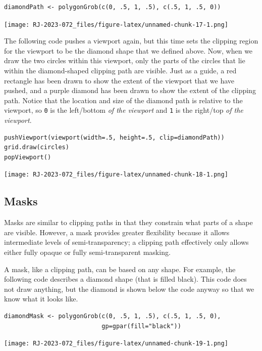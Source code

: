 \begin{verbatim}
diamondPath <- polygonGrob(c(0, .5, 1, .5), c(.5, 1, .5, 0))
\end{verbatim}

\texttt{[image: RJ-2023-072\_files/figure-latex/unnamed-chunk-17-1.png]}

The following code pushes a viewport again,
but this time sets the clipping region for the viewport
to be the diamond shape that we defined above.
Now, when we draw the two circles within this viewport,
only the parts of the circles that lie within the diamond-shaped
clipping path are visible.
Just as a guide, a red rectangle has been drawn to show the extent
of the viewport that we have pushed, and a purple diamond has been
drawn to show the extent of the clipping path. Notice that the
location and size of the diamond path is relative to the viewport,
so \texttt{0} is the left/bottom \emph{of the viewport} and \texttt{1} is the right/top \emph{of
the viewport}.

\begin{verbatim}
pushViewport(viewport(width=.5, height=.5, clip=diamondPath))
grid.draw(circles)
popViewport()
\end{verbatim}

\texttt{[image: RJ-2023-072\_files/figure-latex/unnamed-chunk-18-1.png]}

\hypertarget{masks}{%
\subsection{Masks}\label{masks}}

Masks are similar to clipping paths in that they constrain what parts
of a shape are visible. However, a mask provides greater flexibility
because it allows intermediate levels of semi-transparency;
a clipping path effectively only allows either fully opaque or
fully semi-transparent masking.

A mask, like a clipping path, can be based on any shape.
For example, the following code describes a diamond shape
(that is filled black).
This code does not draw anything, but the diamond is shown below
the code anyway so that we know what it looks like.

\begin{verbatim}
diamondMask <- polygonGrob(c(0, .5, 1, .5), c(.5, 1, .5, 0),
                           gp=gpar(fill="black"))
\end{verbatim}

\texttt{[image: RJ-2023-072\_files/figure-latex/unnamed-chunk-19-1.png]}

